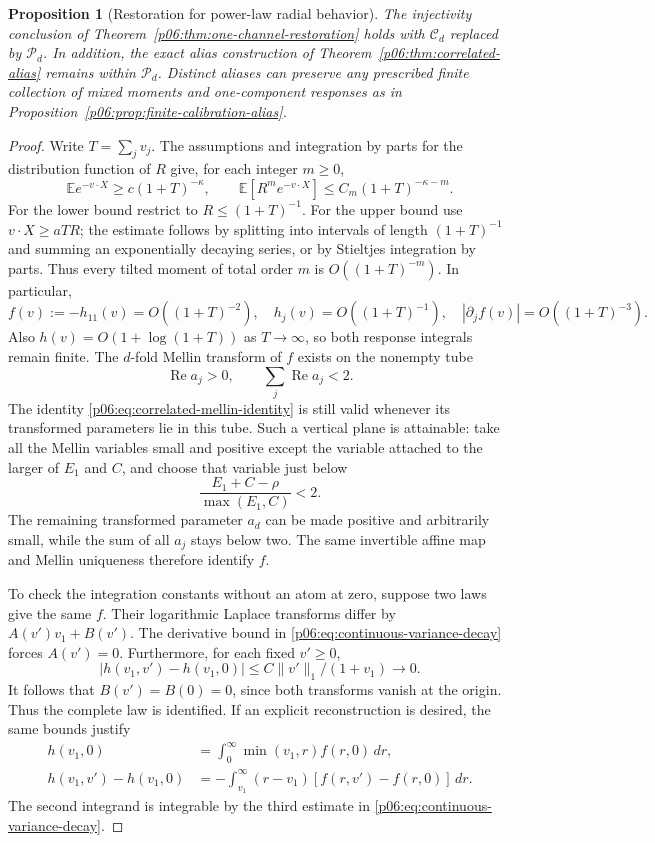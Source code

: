 \documentclass[11pt,letterpaper]{article}
\newtheorem{proposition}[theorem]{Proposition}
\theoremstyle{definition}
\theoremstyle{remark}
\renewcommand{\Re}{\operatorname{Re}}
\newcommand{\1}{\mathbf 1}
\begin{document}
\begin{proposition}[Restoration for power-law radial behavior]
\label{p06:prop:continuous-restoration}
The injectivity conclusion of
Theorem~\ref{p06:thm:one-channel-restoration} holds with $\mathcal C_d$
replaced by $\mathcal P_d$. In addition, the exact alias construction
of Theorem~\ref{p06:thm:correlated-alias} remains within $\mathcal P_d$.
Distinct aliases can preserve any prescribed finite collection of mixed
moments and one-component responses as in
Proposition~\ref{p06:prop:finite-calibration-alias}.
\end{proposition}
\begin{proof}
Write $T=\sum_jv_j$. The assumptions and integration by parts for the
distribution function of $R$ give, for each integer $m\ge0$,
\[
 \mathbb E e^{-v\cdot X}\ge c(1+T)^{-\kappa},\qquad
 \mathbb E[R^m e^{-v\cdot X}]
 \le C_m(1+T)^{-\kappa-m}.
\]
For the lower bound restrict to $R\le(1+T)^{-1}$.
For the upper bound use $v\cdot X\ge aTR$; the estimate follows by
splitting into intervals of length $(1+T)^{-1}$ and summing an
exponentially decaying series, or by Stieltjes integration by parts.
Thus every tilted moment of total order $m$ is
$O((1+T)^{-m})$. In particular,
\begin{equation}\label{p06:eq:continuous-variance-decay}
 f(v):=-h_{11}(v)=O((1+T)^{-2}),\quad
 h_j(v)=O((1+T)^{-1}),\quad
 |\partial_j f(v)|=O((1+T)^{-3}).
\end{equation}
Also $h(v)=O(1+\log(1+T))$ as $T\to\infty$, so both response
integrals remain finite. The $d$-fold Mellin transform of $f$ exists
on the nonempty tube
\[
 \Re a_j>0,\qquad \sum_j\Re a_j<2.
\]
The identity \eqref{p06:eq:correlated-mellin-identity} is still valid whenever
its transformed parameters lie in this tube. Such a vertical plane
is attainable: take all the Mellin variables small and positive except
the variable attached to the larger of $E_1$ and $C$, and choose that
variable just below
\[
 \frac{E_1+C-\rho}{\max(E_1,C)}<2.
\]
The remaining transformed parameter $a_d$ can be made positive and
arbitrarily small, while the sum of all $a_j$ stays below two.
The same invertible affine map and Mellin uniqueness therefore identify
$f$.

To check the integration constants without an atom at zero, suppose two
laws give the same $f$. Their logarithmic Laplace transforms differ by
$A(v')v_1+B(v')$. The derivative bound in
\eqref{p06:eq:continuous-variance-decay} forces $A(v')=0$.
Furthermore, for each fixed $v'\ge0$,
\[
 |h(v_1,v')-h(v_1,0)|\le
 C\|v'\|_1/(1+v_1)\longrightarrow0.
\]
It follows that $B(v')=B(0)=0$, since both transforms vanish at the
origin. Thus the complete law is identified.
If an explicit reconstruction is desired, the same bounds justify
\begin{align*}
 h(v_1,0)&=\int_0^\infty\min(v_1,r)f(r,0)\,dr,\\
 h(v_1,v')-h(v_1,0)
 &=-\int_{v_1}^\infty(r-v_1)
       [f(r,v')-f(r,0)]\,dr.
\end{align*}
The second integrand is integrable by the third estimate in
\eqref{p06:eq:continuous-variance-decay}.


\end{proof}
\end{document}
